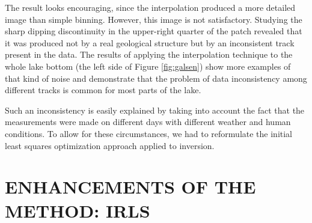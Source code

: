 \par
The result looks encouraging, since the interpolation produced a
more detailed 
image than simple binning. However, this image is not satisfactory.
Studying the sharp dipping discontinuity in the upper-right quarter of
the patch 
revealed that it was produced not by a real geological structure but by an
inconsistent track present in the data. The results of applying the
interpolation 
technique to the whole lake bottom (the left side of Figure
\ref{fig:galsen}) show more 
examples of that 
kind of noise and demonstrate that the problem of data inconsistency among
different tracks is common for most parts of the lake. 
\par
Such an inconsistency is
easily explained by taking into account the fact that the measurements
were made on 
different days with different weather and human conditions. To allow for these
circumstances, we had to reformulate the initial least squares optimization
approach applied to inversion.
{}

\section{ENHANCEMENTS OF THE METHOD: IRLS}

